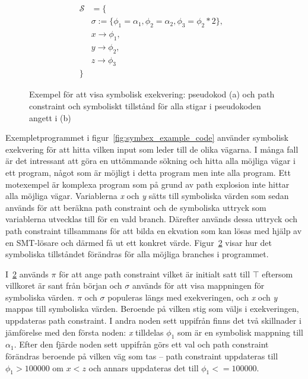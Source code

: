 \begin{figure}[H]
\begin{subfigure}[t]{0.5\textwidth}
        \caption{} %
        \label{fig:symbex_example_graph}
    \end{subfigure}
    \begin{align*}
        \mathcal{S} & = \{                                                                & \\
                    & \sigma := \{\phi_1 = \alpha_1, \phi_2 = \alpha_2, \phi_3 = \phi_2 *
        2\},        &                                                                       \\
                    & x \rightarrow \phi_1,                                               & \\
                    & y \rightarrow \phi_2,                                               & \\
                    & z \rightarrow \phi_3                                                & \\
        \}
    \end{align*}
    \caption{Exempel för att visa symbolisk exekvering: pseudokod (a) och path
        constraint och symboliskt tillstånd för alla stigar i pseudokoden angett i (b)}
\end{figure}

Exempletprogrammet i figur~\ref{fig:symbex_example_code} använder symbolisk
exekvering för att hitta vilken input som leder till de olika vägarna. I många
fall är det intressant att göra en uttömmande sökning och hitta alla möjliga
vägar i ett program, något som är möjligt i detta program men inte alla program.
Ett motexempel är komplexa program som på grund av path explosion inte hittar
alla möjliga vägar.
Variablerna \emph{x} och \emph{y} sätts till symboliska värden som sedan används
för att beräkna path constraint och de symboliska uttryck som variablerna
utvecklas till för en vald branch. Därefter används dessa uttryck och path
constraint tillsammans för att bilda en ekvation som kan lösas med hjälp av en
SMT-lösare och därmed få ut ett konkret värde.
Figur~\ref{fig:symbex_example_graph} visar hur det symboliska tillståndet
förändras för alla möjliga branches i programmet.

I~\ref{fig:symbex_example_graph} används $\pi$ för att ange path constraint
vilket är initialt satt till $\top$ eftersom villkoret är sant från början och
$\sigma$ används för att visa mappningen för symboliska värden. $\pi$ och
$\sigma$ populeras längs med exekveringen, och \emph{x} och \emph{y} mappas till
symboliska värden. Beroende på vilken stig som väljs i exekveringen, uppdateras
path constraint. I andra noden sett uppifrån finns det två skillnader i
jämförelse med den första noden: \emph{x} tilldelas $\phi_1$ som är en symbolisk
mappning till $\alpha_1$. Efter den fjärde noden sett uppifrån görs ett val och
path constraint förändras beroende på vilken väg som tas -- path constraint
uppdateras till $\phi_1 > 100000$ om $x < z$ och annars uppdateras det till
$\phi_1 <= 100000$.
